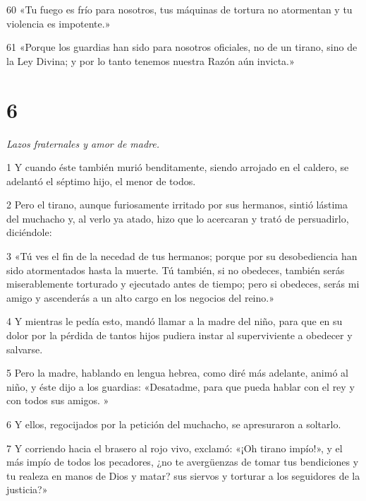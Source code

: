 \par 60 «Tu fuego es frío para nosotros, tus máquinas de tortura no atormentan y tu violencia es impotente.»

\par 61 «Porque los guardias han sido para nosotros oficiales, no de un tirano, sino de la Ley Divina; y por lo tanto tenemos nuestra Razón aún invicta.»

\chapter{6}

\par \textit{Lazos fraternales y amor de madre.}

\par 1 Y cuando éste también murió benditamente, siendo arrojado en el caldero, se adelantó el séptimo hijo, el menor de todos.

\par 2 Pero el tirano, aunque furiosamente irritado por sus hermanos, sintió lástima del muchacho y, al verlo ya atado, hizo que lo acercaran y trató de persuadirlo, diciéndole:

\par 3 «Tú ves el fin de la necedad de tus hermanos; porque por su desobediencia han sido atormentados hasta la muerte. Tú también, si no obedeces, también serás miserablemente torturado y ejecutado antes de tiempo; pero si obedeces, serás mi amigo y ascenderás a un alto cargo en los negocios del reino.»

\par 4 Y mientras le pedía esto, mandó llamar a la madre del niño, para que en su dolor por la pérdida de tantos hijos pudiera instar al superviviente a obedecer y salvarse.

\par 5 Pero la madre, hablando en lengua hebrea, como diré más adelante, animó al niño, y éste dijo a los guardias: «Desatadme, para que pueda hablar con el rey y con todos sus amigos. »

\par 6 Y ellos, regocijados por la petición del muchacho, se apresuraron a soltarlo.

\par 7 Y corriendo hacia el brasero al rojo vivo, exclamó: «¡Oh tirano impío!», y el más impío de todos los pecadores, ¿no te avergüenzas de tomar tus bendiciones y tu realeza en manos de Dios y matar? sus siervos y torturar a los seguidores de la justicia?»

